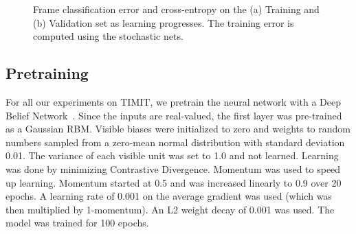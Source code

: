 \documentclass[12pt]{article}
\begin{document}
\begin{figure}[h!]
\centerline{
}
\centerline{
}
\caption{Frame classification error and cross-entropy on the (a) Training and
(b) Validation set as learning progresses. 
The training error is computed using the stochastic nets.}
\label{fig:timit}
\end{figure}

\subsection{Pretraining}
\label{sec:timit_pre}
For all our experiments on TIMIT, we pretrain the neural network with a
Deep Belief Network~\cite{Science}.
Since the inputs are real-valued, the first layer was pre-trained as a Gaussian RBM. Visible biases were initialized
to zero and weights to random numbers sampled from a zero-mean normal distribution with
standard deviation 0.01. The variance of each visible unit was set to 1.0 and
not learned. Learning was done by minimizing Contrastive Divergence. Momentum
was used to speed up learning. Momentum started at 0.5 and was increased
linearly to 0.9 over 20 epochs. A learning rate of 0.001 on the average gradient
was used (which was then multiplied by 1-momentum). An L2 weight decay of 0.001 was used. The model was
trained for 100 epochs.
\end{document}
